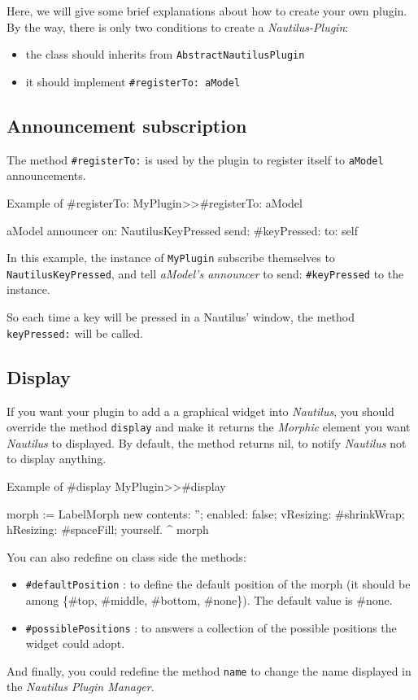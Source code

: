\documentclass[a4paper,10pt,twoside]{book}
\newcommand\nautilus{\emph{Nautilus}\xspace}
\begin{document}
Here, we will give some brief explanations about how to create your own plugin.
By the way, there is only two conditions to create a \emph{Nautilus-Plugin}:
\begin{itemize}
	\item the class should inherits from \verb?AbstractNautilusPlugin?
	\item it should implement \verb?#registerTo: aModel?
\end{itemize}

\subsection{Announcement subscription}

The method \verb?#registerTo:? is used by the plugin to register itself to \verb?aModel? announcements.

\begin{code}{Example of #registerTo:}
MyPlugin>>#registerTo: aModel

	aModel announcer
		on: NautilusKeyPressed send: #keyPressed: to: self
\end{code}
In this example, the instance of \verb?MyPlugin? subscribe themselves to \verb?NautilusKeyPressed?, and tell \emph{aModel's announcer} to send: \verb?#keyPressed? to the instance.

So each time a key will be pressed in a Nautilus' window, the method \verb?keyPressed:? will be called.

\subsection{Display}

If you want your plugin to add a a graphical widget into \nautilus, you should override the method \verb?display? and make it returns the \emph{Morphic} element you want \nautilus to displayed. By default, the method returns nil, to notify \nautilus not to display anything.

\begin{code}{Example of #display}
MyPlugin>>#display

	morph :=  LabelMorph new 
					contents: '';
					enabled: false;
					vResizing: #shrinkWrap;
					hResizing: #spaceFill;
					yourself.
	^ morph
\end{code}

You can also redefine on class side the methods:
\begin{itemize}
	\item \verb?#defaultPosition? : to define the default position of the morph (it should be among \{\#top, \#middle, \#bottom, \#none\}). The default value is \#none.
	\item \verb?#possiblePositions? : to answers a collection of the possible positions the widget could adopt.
\end{itemize}

And finally, you could redefine the method \verb?name? to change the name displayed in the \emph{Nautilus Plugin Manager}.
\end{document}
